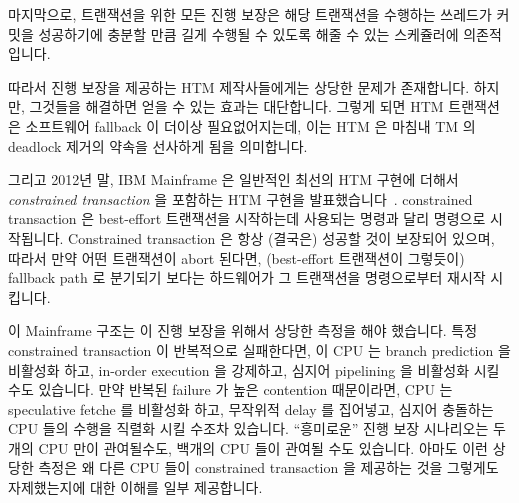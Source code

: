 마지막으로, 트랜잭션을 위한 모든 진행 보장은 해당 트랜잭션을 수행하는 쓰레드가
커밋을 성공하기에 충분할 만큼 길게 수행될 수 있도록 해줄 수 있는 스케쥴러에
의존적입니다.

따라서 진행 보장을 제공하는 HTM 제작사들에게는 상당한 문제가 존재합니다.
하지만, 그것들을 해결하면 얻을 수 있는 효과는 대단합니다.
그렇게 되면 HTM 트랜잭션은 소프트웨어 fallback 이 더이상 필요없어지는데, 이는
HTM 은 마침내 TM 의 deadlock 제거의 약속을 선사하게 됨을 의미합니다.

그리고 2012년 말, IBM Mainframe 은 일반적인 최선의 HTM 구현에 더해서
\emph{constrained transaction} 을 포함하는 HTM 구현을
발표했습니다~\cite{ChristianJacobi2012MainframeTM}.
constrained transaction 은 best-effort 트랜잭션을 시작하는데 사용되는
 명령과 달리  명령으로 시작됩니다.
Constrained transaction 은 항상 (결국은) 성공할 것이 보장되어 있으며, 따라서
만약 어떤 트랜잭션이 abort 된다면, (best-effort 트랜잭션이 그렇듯이) fallback
path 로 분기되기 보다는 하드웨어가 그 트랜잭션을  명령으로부터
재시작 시킵니다.
\iffalse

Finally, any forward-progress guarantees for transactions also
depend on the scheduler, which must let the thread executing the
transaction run long enough to successfully commit.

So there are significant obstacles to HTM vendors offering forward-progress
guarantees.
However, the impact of any of them doing so would be enormous.
It would mean that HTM transactions would no longer need software
fallbacks, which would mean that HTM could finally deliver on the
TM promise of deadlock elimination.

And as of late 2012, the IBM Mainframe announced an HTM
implementation that includes \emph{constrained transactions}
in addition to the usual best-effort HTM
implementation~\cite{ChristianJacobi2012MainframeTM}.
A constrained transaction starts with the \co{tbeginc} instruction
instead of the \co{tbegin} instruction that is used for best-effort
transactions.
Constrained transactions are guaranteed to always complete (eventually),
so if a transaction aborts, rather than branching to a fallback path
(as is done for best-effort transactions), the hardware instead restarts
the transaction at the \co{tbeginc} instruction.
\fi

이 Mainframe 구조는 이 진행 보장을 위해서 상당한 측정을 해야 했습니다.
특정 constrained transaction 이 반복적으로 실패한다면, 이 CPU 는 branch
prediction 을 비활성화 하고, in-order execution 을 강제하고, 심지어 pipelining
을 비활성화 시킬 수도 있습니다.
만약 반복된 failure 가 높은 contention 때문이라면, CPU 는 speculative fetche 를
비활성화 하고, 무작위적 delay 를 집어넣고, 심지어 충돌하는 CPU 들의 수행을
직렬화 시킬 수조차 있습니다.
``흥미로운'' 진행 보장 시나리오는 두개의 CPU 만이 관여될수도, 백개의 CPU 들이
관여될 수도 있습니다.
아마도 이런 상당한 측정은 왜 다른 CPU 들이 constrained transaction 을 제공하는
것을 그렇게도 자제했는지에 대한 이해를 일부 제공합니다.

